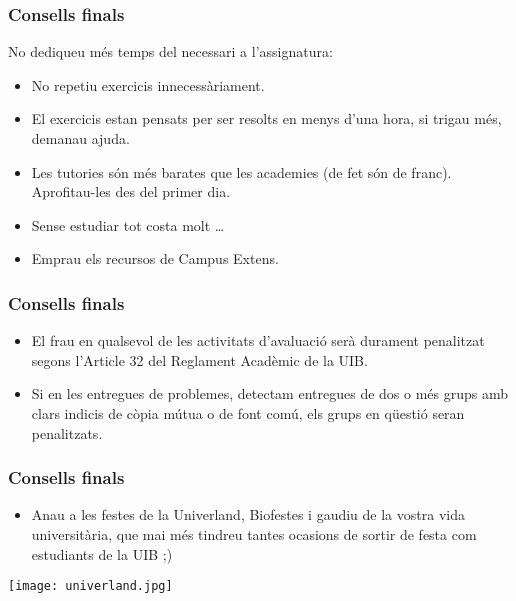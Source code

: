 \documentclass[12pt,t]{beamer}
\theoremstyle{plain}
\theoremstyle{definition}
\begin{document}
\begin{frame}
\frametitle{Consells finals}

No dediqueu més temps del necessari a l'assignatura:
\begin{itemize}
\item No repetiu exercicis innecessàriament.
\medskip

\item El exercicis estan pensats per ser resolts en menys d'una hora, si trigau més, demanau ajuda.
\medskip
\item Les tutories són més barates que les academies (de fet són de franc). Aprofitau-les des del primer dia. 

\item Sense estudiar tot costa molt \ldots
\medskip

\item Emprau els recursos de Campus Extens.
\medskip
\end{itemize}

\end{frame}

\begin{frame}
\frametitle{Consells finals}

\begin{itemize}

\item El frau en qualsevol de les activitats d'avaluació serà durament penalitzat segons l'Article 32 del Reglament Acadèmic de la UIB.

\item Si en les entregues de problemes, detectam entregues de dos o més grups amb clars indicis de còpia mútua o de font comú, els grups en qüestió seran penalitzats.

\end{itemize}

\end{frame}




\begin{frame}
\frametitle{Consells finals}

\begin{itemize}

\item Anau a les festes de la Univerland, Biofestes i gaudiu de la vostra vida universitària, que mai més tindreu tantes ocasions  de sortir de festa com estudiants de la UIB ;)

\end{itemize}
\centering

\texttt{[image: univerland.jpg]}\\

\end{frame}
\end{document}
